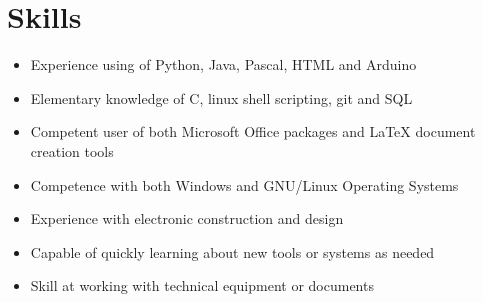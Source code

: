 \documentclass[12pt,a4paper,notitlepage]{article}
\begin{document}
\section*{Skills}
\begin{itemize}
\item Experience using of Python, Java, Pascal, HTML and Arduino
\item Elementary knowledge of C, linux shell scripting, git and SQL
\item Competent user of both Microsoft Office packages and LaTeX document creation tools
\item Competence with both Windows and GNU/Linux Operating Systems
\item Experience with electronic construction and design
\item Capable of quickly learning about new tools or systems as needed
\item Skill at working with technical equipment or documents
\end{itemize}
\end{document}
